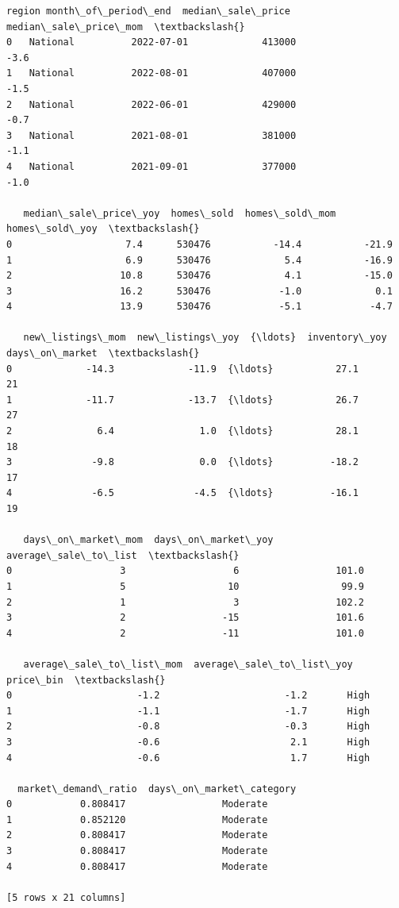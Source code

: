 \documentclass[11pt]{article}
\makeatletter
\newcommand{\boxspacing}{\kern\kvtcb@left@rule\kern\kvtcb@boxsep}
\newcommand{\prompt}[4]{
        {\ttfamily\llap{{\color{#2}[#3]:\hspace{3pt}#4}}\vspace{-\baselineskip}}
    }
\makeatother
\begin{document}
            \begin{tcolorbox}[breakable, size=fbox, boxrule=.5pt, pad at break*=1mm, opacityfill=0]
\prompt{Out}{outcolor}{35}{\boxspacing}
\begin{Verbatim}[commandchars=\\\{\}]
      region month\_of\_period\_end  median\_sale\_price  median\_sale\_price\_mom  \textbackslash{}
0   National          2022-07-01             413000                   -3.6
1   National          2022-08-01             407000                   -1.5
2   National          2022-06-01             429000                   -0.7
3   National          2021-08-01             381000                   -1.1
4   National          2021-09-01             377000                   -1.0

   median\_sale\_price\_yoy  homes\_sold  homes\_sold\_mom  homes\_sold\_yoy  \textbackslash{}
0                    7.4      530476           -14.4           -21.9
1                    6.9      530476             5.4           -16.9
2                   10.8      530476             4.1           -15.0
3                   16.2      530476            -1.0             0.1
4                   13.9      530476            -5.1            -4.7

   new\_listings\_mom  new\_listings\_yoy  {\ldots}  inventory\_yoy  days\_on\_market  \textbackslash{}
0             -14.3             -11.9  {\ldots}           27.1              21
1             -11.7             -13.7  {\ldots}           26.7              27
2               6.4               1.0  {\ldots}           28.1              18
3              -9.8               0.0  {\ldots}          -18.2              17
4              -6.5              -4.5  {\ldots}          -16.1              19

   days\_on\_market\_mom  days\_on\_market\_yoy  average\_sale\_to\_list  \textbackslash{}
0                   3                   6                 101.0
1                   5                  10                  99.9
2                   1                   3                 102.2
3                   2                 -15                 101.6
4                   2                 -11                 101.0

   average\_sale\_to\_list\_mom  average\_sale\_to\_list\_yoy  price\_bin  \textbackslash{}
0                      -1.2                      -1.2       High
1                      -1.1                      -1.7       High
2                      -0.8                      -0.3       High
3                      -0.6                       2.1       High
4                      -0.6                       1.7       High

  market\_demand\_ratio  days\_on\_market\_category
0            0.808417                 Moderate
1            0.852120                 Moderate
2            0.808417                 Moderate
3            0.808417                 Moderate
4            0.808417                 Moderate

[5 rows x 21 columns]
\end{Verbatim}
\end{tcolorbox}
        
\end{document}
